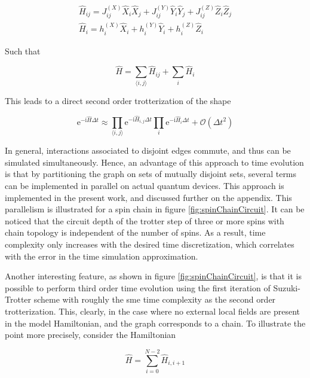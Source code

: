   \begin{gather}
    \hat{H}_{ij} = J_{ij}^{(X)} \hat{X}_i \hat{X}_j + J_{ij}^{(Y)} \hat{Y}_i \hat{Y}_j + J_{ij}^{(Z)} \hat{Z}_i \hat{Z}_j \\
    \hat{H}_{i} = h_i^{(X)} \hat{X}_i + h_i^{(Y)} \hat{Y}_i + h_i^{(Z)} \hat{Z}_i
    \label{eq:HamiltonianDecomposition}
  \end{gather}

  Such that

  \begin{equation}
    \hat{H} = \sum_{\langle i,j \rangle} \hat{H}_{ij} + \sum_i \hat{H}_i
  \end{equation}

  This leads to a direct second order trotterization of the shape

  \begin{equation}
    \mathrm{e}^{-\mathrm{i}\hat{H}\Delta t} \approx \prod_{\langle i,j \rangle} \mathrm{e}^{-\mathrm{i}\hat{H}_{i,j}\Delta t} \prod_{i} \mathrm{e}^{-\mathrm{i}\hat{H}_i \Delta t} + \mathcal{O}(\Delta t^2)
    \label{eq:HamiltonianTrotterization}
  \end{equation}

  In general, interactions associated to disjoint edges commute, and thus can be simulated simultaneously. Hence, an advantage of this approach to time evolution is that by partitioning the graph on sets of mutually disjoint sets, several terms can be implemented in parallel on actual quantum devices. This approach is implemented in the present work, and discussed further on the appendix. This parallelism is illustrated for a spin chain in figure \ref{fig:spinChainCircuit}. It can be noticed that the circuit depth of the trotter step of three or more spins with chain topology is independent of the number of spins. As a result, time complexity only increases with the desired time discretization, which correlates with the error in the time simulation approximation. 
  
  Another interesting feature, as shown in figure \ref{fig:spinChainCircuit}, is that it is possible to perform third order time evolution using the first iteration of Suzuki-Trotter scheme with roughly the sme time complexity as the second order trotterization. This, clearly, in the case where no external local fields are present in the model Hamiltonian, and the graph corresponds to a chain. To illustrate the point more precisely, consider the Hamiltonian

  \begin{equation}
    \hat{H} = \sum_{i=0}^{N-2} \hat{H}_{i,i+1}
    \label{eq:ChainHamiltonian}
  \end{equation}


